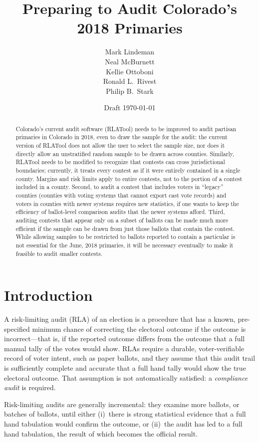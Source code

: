 \documentclass[12pt]{article}
\title{Preparing to Audit Colorado's 2018 Primaries}
\author{
   Mark Lindeman\\
   Neal McBurnett\\
   Kellie Ottoboni\\
   Ronald L.~Rivest\\
   Philip B.~Stark
}
\date{Draft \today}
\begin{document}
\maketitle


\begin{abstract}
Colorado's current audit software (RLATool) needs to be improved to audit partisan 
primaries in Colorado in 2018, even to draw the sample for the audit:
the current version of RLATool does not allow the user to select the sample size, nor does
it directly allow an unstratified random sample to be drawn across counties.
Similarly, RLATool needs to be modified to recognize that contests can cross jurisdictional
boundaries; currently, it treats every contest as if it were entirely
contained in a single county.
Margins and risk limits apply to entire contests, not to the portion of a contest
included in a county.
Second, to audit a contest that includes voters in ``legacy'' counties 
(counties with voting systems that cannot export cast vote records) 
and voters in counties with newer systems requires new statistics, if one wants to
keep the efficiency of ballot-level comparison audits that the newer systems
afford.
Third, auditing contests that appear only on a subset of ballots can
be made much more efficient if the sample can be drawn from just those ballots
that contain the contest.
While allowing samples to be restricted to ballots reported to contain a particular
is not essential for the June, 2018 primaries, it will be necessary
eventually to make it feasible to audit smaller contests.
\end{abstract}

\section{Introduction}
A risk-limiting audit (RLA) of an election is a procedure that
has a known, pre-specified minimum chance of correcting the electoral outcome if the outcome
is incorrect---that is, if the reported outcome differs from the outcome that a full manual
tally of the votes would show. 
RLAs require a durable, voter-verifiable record of voter intent, such as paper ballots,
and they assume that this audit trail is sufficiently complete and accurate that a full hand
tally would show the true electoral outcome.
That assumption is not automatically satisfied: a \emph{compliance audit} is required.

Risk-limiting audits are generally incremental: they examine more ballots, or batches of ballots,
until either (i)~there is strong statistical evidence that a full hand tabulation would confirm the outcome,
or (ii)~the audit has led to a full hand tabulation, the result of which becomes the official
result.
\end{document}
